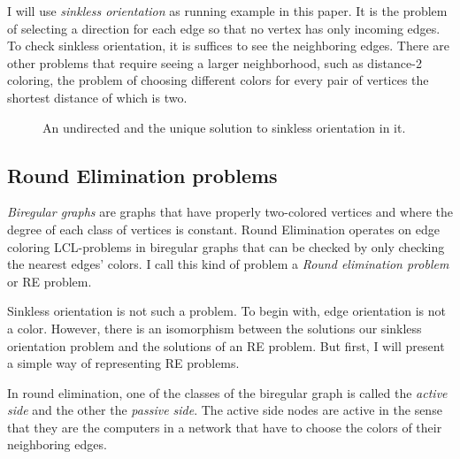\documentclass[english, 12pt, a4paper, sci, a-1b, online]{aaltothesis}
\begin{document}
I will use \emph{sinkless orientation} as running example in this paper. It is the problem of selecting a direction for each edge so that no vertex has only incoming edges. To check sinkless orientation, it is suffices to see the neighboring edges. There are other problems that require seeing a larger neighborhood, such as distance-2 coloring, the problem of choosing different colors for every pair of vertices the shortest distance of which is two.

\newcommand\samplegraph
{
  \node [active] at (0,0) (a) {};
  \node [active] at (1,0) (b) {};
  \node [active] at (2,0) (c) {};
  \node [active] at (1.5,1) (d) {};
}

\begin{figure}[h]
\centering
{}
\caption{An undirected and the unique solution to sinkless orientation in it.}
\end{figure}

\subsection{Round Elimination problems}

\emph{Biregular graphs} are graphs that have properly two-colored vertices and where the degree of each class of vertices is constant. Round Elimination operates on edge coloring LCL-problems in biregular graphs that can be checked by only checking the nearest edges' colors. I call this kind of problem a \emph{Round elimination problem} or RE problem.

Sinkless orientation is not such a problem. To begin with, edge orientation is not a color. However, there is an isomorphism between the solutions our sinkless orientation problem and the solutions of an RE problem. But first, I will present a simple way of representing RE problems.

In round elimination, one of the classes of the biregular graph is called the \emph{active side} and the other the \emph{passive side}. The active side nodes are active in the sense that they are the computers in a network that have to choose the colors of their neighboring edges.
\end{document}
